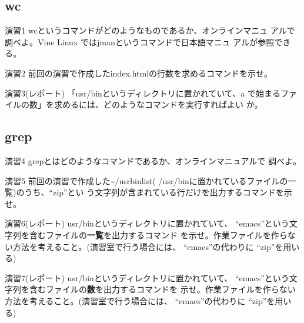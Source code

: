 \documentclass[a4j,10pt]{jarticle}
\begin{document}
\subsection{wc}
\begin{itembox}{演習1}
 {\sffamily wc}というコマンドがどのようなものであるか、オンラインマニュ
 アルで調べよ。Vine Linux では{\sffamily jman}というコマンドで日本語マニュ
 アルが参照できる。
\end{itembox}
\begin{itembox}{演習2}
 前回の演習で作成した{\sffamily index.html}の行数を求めるコマンドを示せ。
\end{itembox}
\begin{itembox}{演習3(レポート)}
 「{\sffamily {\slash}usr{\slash}bin}というディレクトリに置かれていて、a
 で始まるファイルの数」を求めるには、どのようなコマンドを実行すればよい
 か。
\end{itembox}
\subsection{grep}
\begin{itembox}{演習4}
 {\sffamily grep}とはどのようなコマンドであるか、オンラインマニュアルで
 調べよ。
\end{itembox}
\begin{itembox}{演習5}
 前回の演習で作成した{\sffamily \~{}{\slash}usrbinlist}({\sffamily
 {\slash}usr{\slash}bin}に置かれているファイルの一覧)のうち、``zip''とい
 う文字列が含まれている行だけを出力するコマンドを示せ。
\end{itembox}
\begin{itembox}{演習6(レポート)}
 {\sffamily {\slash}usr{\slash}bin}というディレクトリに置かれていて、
 ``emacs''という文字列を含むファイルの{\bfseries 一覧}を出力するコマンド
 を示せ。作業ファイルを作らない方法を考えること。(演習室で行う場合には、
 ``emacs''の代わりに ``zip''を用いる)
\end{itembox}
\begin{itembox}{演習7(レポート)}
 {\sffamily {\slash}usr{\slash}bin}というディレクトリに置かれていて、
 ``emacs''という文字列を含むファイルの{\bfseries 数}を出力するコマンドを
 示せ。作業ファイルを作らない方法を考えること。(演習室で行う場合には、
 ``emacs''の代わりに ``zip''を用いる)
\end{itembox}
\end{document}
